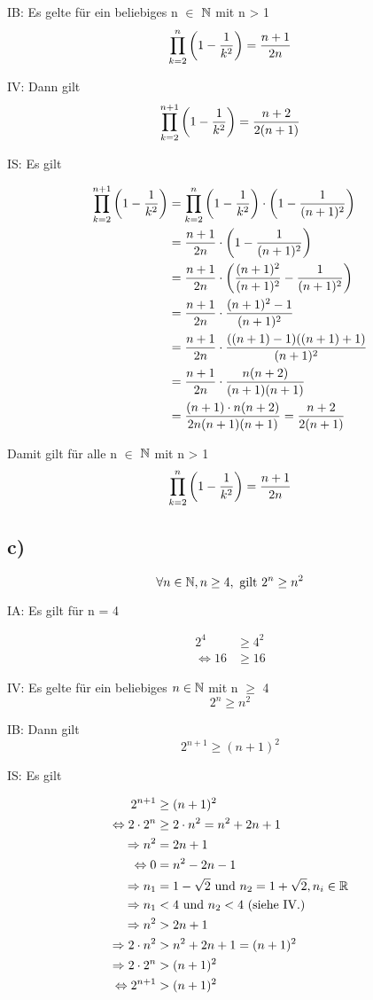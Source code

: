 \documentclass[a4paper, 11pt]{article}
\begin{document}
IB:
  Es gelte für ein beliebiges n \(\in\) \(\mathbb{N}\) mit n > 1
$$ \prod_{k=2}^{n} \left(1 - \frac{1}{k^2}\right) = \frac{n + 1}{2n} $$

IV:
  Dann gilt
$$ \prod_{k=2}^{n + 1} \left(1 - \frac{1}{k^2}\right) = \frac{n + 2}{2(n + 1)} $$

IS:
  Es gilt

\begin{align*}
    \prod_{k = 2}^{n + 1} \left(1 - \frac{1}{k^2}\right) &= \prod_{k = 2}^{n} \left(1 - \frac{1}{k^2}\right) \cdot \left(1 - \frac{1}{(n + 1)^2}\right) \\
    &= \frac{n + 1}{2n} \cdot \left(1 - \frac{1}{(n + 1)^2}\right) \\
    &= \frac{n + 1}{2n} \cdot \left(\frac{(n+1)^2}{(n+1)^2} - \frac{1}{(n + 1)^2}\right) \\
    &= \frac{n + 1}{2n} \cdot \frac{(n+1)^2 - 1}{(n+1)^2} \\
    &= \frac{n + 1}{2n} \cdot \frac{((n+1) - 1)((n+1) + 1)}{(n + 1)^2} \\
    &= \frac{n + 1}{2n} \cdot \frac{n(n + 2)}{(n + 1)(n + 1)} \\
    &= \frac{(n + 1) \cdot n(n + 2)}{2n(n + 1)(n + 1)}
    = \frac{n + 2}{2(n + 1)}
\end{align*}


Damit gilt für alle n \(\in\) \(\mathbb{N}\) mit n > 1
$$ \prod_{k=2}^{n} \left(1 - \frac{1}{k^2}\right) = \frac{n + 1}{2n} $$

\subsection{c)}
\label{sec:org84a5b7a}
$$ \forall n \in \mathbb{N}, n \geq 4, \text{ gilt } 2^n \geq n^2 $$

IA:
  Es gilt für n = 4

\begin{align*}
    2^4 &\geq 4^2 \\
    \Leftrightarrow 16 &\geq 16
\end{align*}

IV:
  Es gelte für ein beliebiges \(n \in \mathbb{N}\) mit n \(\ge\) 4
$$ 2^n \geq n^2 $$

IB:
  Dann gilt
$$ 2^{n + 1} \geq (n + 1)^2 $$

IS:
  Es gilt

\begin{align*}
    2^{n + 1} &\geq (n + 1)^2 \\
    \Leftrightarrow 2 \cdot 2^n &\geq 2 \cdot n^2 = n^2 + 2n + 1 \\
    \Rightarrow n^2 &= 2n + 1 \\
    \Leftrightarrow 0 &= n^2 - 2n - 1 \\
    \Rightarrow n_1 &= 1 - \sqrt{2} \text{ und } n_2 = 1 + \sqrt{2}, n_i \in \mathbb{R} \\
    \Rightarrow n_1 &< 4 \text{ und } n_2 < 4 \text{ (siehe IV.)} \\
    \Rightarrow n^2 &> 2n + 1 \\
    \Rightarrow 2 \cdot n^2 &> n^2 + 2n + 1 = (n + 1)^2 \\
    \Rightarrow 2 \cdot 2^n &> (n + 1)^2 \\
    \Leftrightarrow 2^{n + 1} &> (n + 1)^2
\end{align*}
\end{document}
